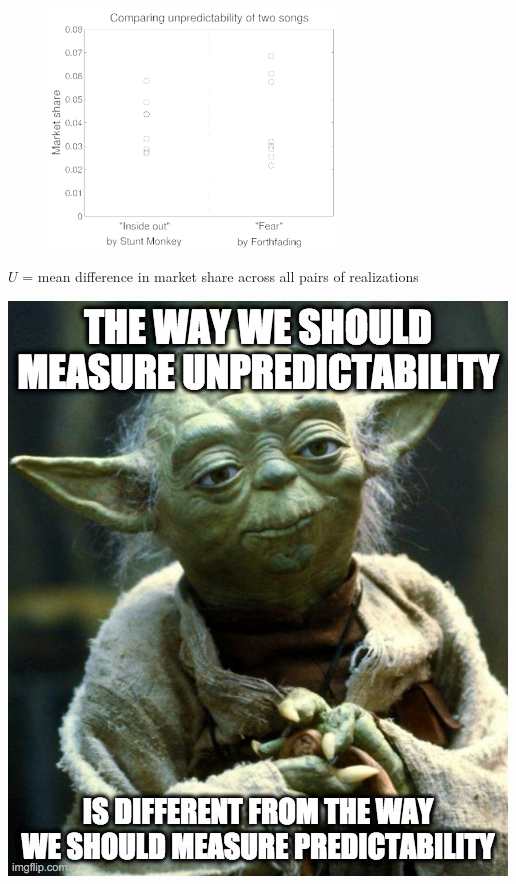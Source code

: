 \documentclass[aspectratio=169]{beamer}
\begin{document}
\begin{frame}

\begin{figure}
  \centering
  \includegraphics[width = 3in]{figures/arbitrary_example}
\end{figure}

$U$ = mean difference in market share across all pairs of realizations

\end{frame}
\begin{frame}

\begin{center}
\includegraphics[height=0.9\textheight]{figures/the_way_we_should_unpredictability}
\end{center}

\end{frame}
\end{document}
